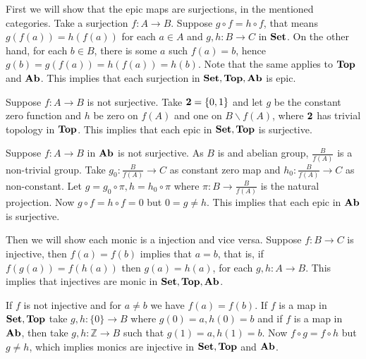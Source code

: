 
First we will show that the epic maps are surjections, in the mentioned categories.
Take a surjection $f:A \to B$. Suppose $g \circ f = h \circ f$, that means $g(f(a))=h(f(a))$ for each $a \in A$ and $g,h: B \to C$ in $\bold{Set}$. On the other hand, for each $b \in B$, there is some $a$ such $f(a)=b$, hence $g(b)=g(f(a))=h(f(a))=h(b)$. Note that the same applies to $\bold{Top}$ and $\bold{Ab}$. This implies that each surjection in $\bold{Set}, \bold{Top}, \bold{Ab}$ is epic.

Suppose $f: A \to B$ is not surjective. Take $\bold 2=\{0,1\}$ and let $g$ be the constant zero function and $h$ be zero on $f(A)$ and one on $B \backslash f(A)$, where $\bold 2$ has trivial topology in $\bold{Top}$. This implies that each epic in $\bold{Set}, \bold{Top}$ is surjective.

Suppose $f:A \to B$ in $\bold{Ab}$ is not surjective. As $B$ is and abelian group, $\frac{B}{f(A)}$ is a non-trivial group. Take $g_0:\frac{B}{f(A)} \to C$ as constant zero map and $h_0:\frac{B}{f(A)} \to C$ as non-constant. Let $g = g_0 \circ \pi, h = h_0 \circ \pi$ where $\pi: B \to \frac{B}{f(A)}$ is the natural projection. Now $ g \circ f = h \circ f = 0$ but $0 = g \neq h$. This implies that each epic in $\bold{Ab}$ is surjective.

Then we will show each monic is a injection and vice versa.
Suppose $f: B \to C$ is injective, then $f(a)=f(b)$ implies that $a=b$, that is, if $f(g(a))=f(h(a))$ then $g(a)=h(a)$, for each $g,h : A \to B$. This implies that injectives are monic in $\bold{Set}, \bold{Top}, \bold{Ab}$.

 If $f$ is not injective and for $a \neq b$ we have $f(a)=f(b)$. If $f$ is a map in $\bold{Set}, \bold{Top}$ take $g,h: \{0\} \to B$ where $g(0)=a,h(0)=b$ and if $f$ is a map in $\bold{Ab}$, then take $g,h: \mathbb{Z} \to B$ such that $g(1)=a,h(1)=b$. Now $f \circ g = f \circ h $ but $g \neq h$, which implies monics are injective in $\bold{Set}, \bold{Top}$ and $\bold{Ab}$.
